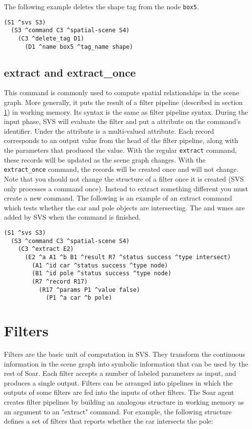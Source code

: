 The following example deletes the shape tag from the node \texttt{box5}.
\begin{verbatim}
(S1 ^svs S3)
  (S3 ^command C3 ^spatial-scene S4)
    (C3 ^delete_tag D1)
      (D1 ^name box5 ^tag_name shape)
\end{verbatim}

\subsection{extract and extract\_once}
This command is commonly used to compute spatial relationships in the scene graph.
More generally, it puts the result of a filter pipeline (described in section \ref{sec:svs-filters}) in working memory.
Its syntax is the same as filter pipeline syntax.
During the input phase, SVS will evaluate the filter and 
put a  attribute on the command's identifier.
Under the  attribute is a multi-valued  attribute.
Each record corresponds to an output value from the head of the filter pipeline, along with the parameters that produced the value.
With the regular \texttt{extract} command, these records will be updated as the scene graph
changes. With the \texttt{extract\_once} command, the records will be created once
and will not change. 
Note that you should not change the structure of a filter once it is created 
(SVS only processes a command once). 
Instead to extract something different you must create a new command. 
The following is an example of an extract command which tests whether the 
car and pole objects are intersecting. The  and  wmes are 
added by SVS when the command is finished. 

\begin{verbatim}
(S1 ^svs S3)
  (S3 ^command C3 ^spatial-scene S4)
    (C3 ^extract E2)
      (E2 ^a A1 ^b B1 ^result R7 ^status success ^type intersect)
        (A1 ^id car ^status success ^type node)
        (B1 ^id pole ^status success ^type node)
        (R7 ^record R17)
          (R17 ^params P1 ^value false)
            (P1 ^a car ^b pole)
\end{verbatim}

\section{Filters}
\label{sec:svs-filters}

Filters are the basic unit of computation in SVS.
They transform the continuous information in the scene graph into symbolic information that can be used by the rest of Soar.
Each filter accepts a number of labeled parameters as input, and produces a single output.
Filters can be arranged into pipelines in which the outputs of some filters are fed into the inputs of other filters.
The Soar agent creates filter pipelines by building an analogous structure in working memory as an argument to an "extract" command.
For example, the following structure defines a set of filters that reports whether the car intersects the pole:

